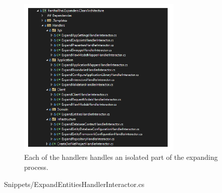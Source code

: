 \begin{figure}[H]
    \centering
    \includegraphics[width=0.7\textwidth]{Figures/expander_handlers.pdf}
    \caption[handlers]{Each of the handlers handles an isolated part of the expanding process.}
    \label{fig:handlers}
\end{figure}


    {Snippets/ExpandEntitiesHandlerInteractor.cs}